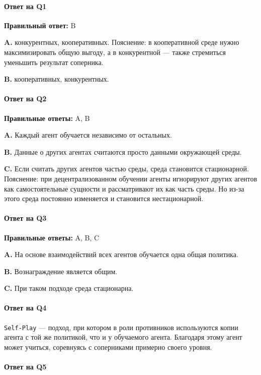 \documentclass[11pt,a4paper]{article}
\begin{document}
\paragraph{Ответ на Q1}

\textbf{Правильный ответ:} B

\textbf{A.} конкурентных, кооперативных. Пояснение: в кооперативной среде нужно максимизировать общую выгоду, а в конкурентной --- также стремиться уменьшить результат соперника.

\textbf{B.} кооперативных, конкурентных.

\paragraph{Ответ на Q2}

\textbf{Правильные ответы:} A, B

\textbf{A.} Каждый агент обучается независимо от остальных.

\textbf{B.} Данные о других агентах считаются просто данными окружающей среды.

\textbf{C.} Если считать других агентов частью среды, среда становится стационарной. Пояснение: при децентрализованном обучении агенты игнорируют других агентов как самостоятельные сущности и рассматривают их как часть среды. Но из-за этого среда постоянно изменяется и становится нестационарной.

\paragraph{Ответ на Q3}

\textbf{Правильные ответы:} A, B, C

\textbf{A.} На основе взаимодействий всех агентов обучается одна общая политика.

\textbf{B.} Вознаграждение является общим.

\textbf{C.} При таком подходе среда стационарна.

\paragraph{Ответ на Q4}

\texttt{Self-Play} --- подход, при котором в роли противников используются копии агента с той же политикой, что и у обучаемого агента. Благодаря этому агент может учиться, соревнуясь с соперниками примерно своего уровня.

\paragraph{Ответ на Q5}
\end{document}
